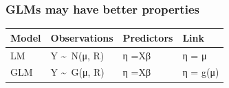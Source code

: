 \documentclass[
	12pt
	]{beamer}
\begin{document}
\begin{frame}[t]
\frametitle{GLMs may have better properties}
\begin{tabular}{llll}
\textbf{Model} & \textbf{Observations} & \textbf{Predictors} & \textbf{Link} \\ \hline
LM & Y \textasciitilde~N(μ, R) & η =Xβ & η = μ \\ \pause
\alert{GLM} & Y \textasciitilde~\alert{G}(μ, R) & η =Xβ & η = \alert{g(}μ\alert{)} \\ 
\end{tabular}
\vspace*{0.5em}
\pause
\setlength{\fboxsep}{1pt}
 \\[0.5em]
\end{frame}
\end{document}
